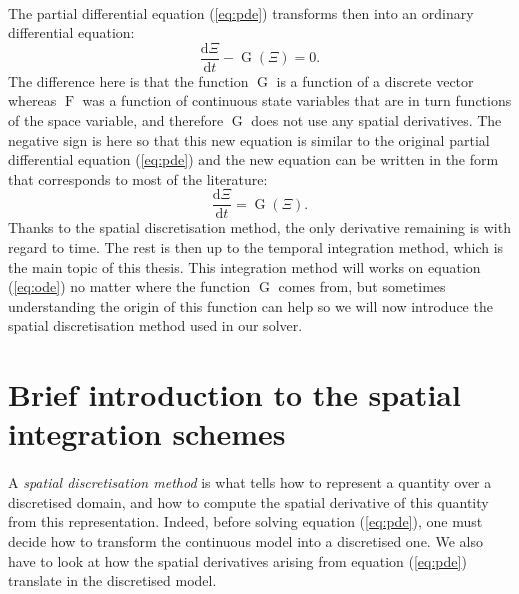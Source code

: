     \paragraph{}
    The partial differential equation (\ref{eq:pde}) transforms then into an ordinary differential equation:
    \begin{equation}
      \frac{\mathrm{d} \Xi}{\mathrm{d} t} - \operatorname{G}\left(\Xi\right) = 0 .
    \end{equation}
    The difference here is that the function $\operatorname{G}$ is a function of a discrete vector whereas $\operatorname{F}$ was a function of continuous state variables that are in turn functions of the space variable, and therefore $\operatorname{G}$ does not use any spatial derivatives.
    The negative sign is here so that this new equation is similar to the original partial differential equation (\ref{eq:pde}) and the new equation can be written in the form that corresponds to most of the literature:
    \begin{equation}\label{eq:ode}
      \frac{\mathrm{d} \Xi}{\mathrm{d} t} = \operatorname{G}\left(\Xi\right) .
    \end{equation}
    Thanks to the spatial discretisation method, the only derivative remaining is with regard to time.
    The rest is then up to the temporal integration method, which is the main topic of this thesis.
    This integration method will works on equation (\ref{eq:ode}) no matter where the function $\operatorname{G}$ comes from, but sometimes understanding the origin of this function can help so we will now introduce the spatial discretisation method used in our solver.


  \section{Brief introduction to the spatial integration schemes}

    \paragraph{}
    A \emph{spatial discretisation method} is what tells how to represent a quantity over a discretised domain, and how to compute the spatial derivative of this quantity from this representation.
    Indeed, before solving equation (\ref{eq:pde}), one must decide how to transform the continuous model into a discretised one.
    We also have to look at how the spatial derivatives arising from equation (\ref{eq:pde}) translate in the discretised model.

